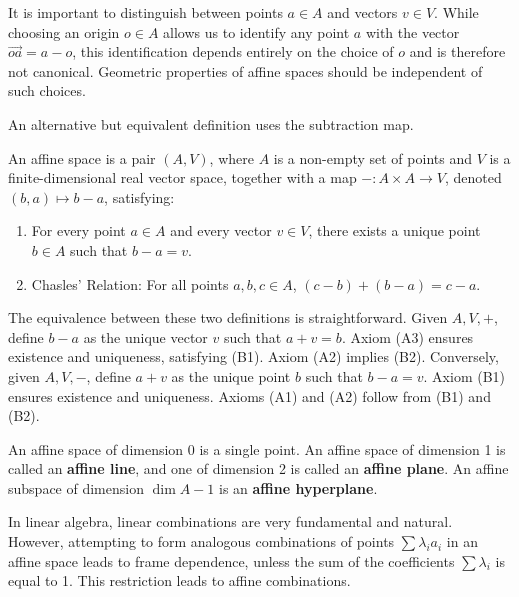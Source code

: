 It is important to distinguish between points $a \in A$ and vectors $v \in V$. While choosing an origin $o \in A$ allows us to identify any point $a$ with the vector $\vec{oa} = a - o$, this identification depends entirely on the choice of $o$ and is therefore not canonical. Geometric properties of affine spaces should be independent of such choices.

An alternative but equivalent definition uses the subtraction map.

\begin{definition}
An affine space is a pair $(A, V)$, where $A$ is a non-empty set of points and $V$ is a finite-dimensional real vector space, together with a map $- : A \times A \to V$, denoted $(b, a) \mapsto b - a$, satisfying:
\begin{enumerate}
    \item[(B1)] For every point $a \in A$ and every vector $v \in V$, there exists a unique point $b \in A$ such that $b - a = v$.
    \item[(B2)] Chasles' Relation: For all points $a, b, c \in A$, $(c - b) + (b - a) = c - a$.
\end{enumerate}
\end{definition}

The equivalence between these two definitions is straightforward. Given $A, V, +$, define $b - a$ as the unique vector $v$ such that $a + v = b$. Axiom (A3) ensures existence and uniqueness, satisfying (B1). Axiom (A2) implies (B2). Conversely, given $A, V, -$, define $a + v$ as the unique point $b$ such that $b - a = v$. Axiom (B1) ensures existence and uniqueness. Axioms (A1) and (A2) follow from (B1) and (B2).

An affine space of dimension 0 is a single point. An affine space of dimension 1 is called an \textbf{affine line}, and one of dimension 2 is called an \textbf{affine plane}. An affine subspace of dimension $\dim A - 1$ is an \textbf{affine hyperplane}.

In linear algebra, linear combinations are very fundamental and natural. However, attempting to form analogous combinations of points $\sum \lambda_i a_i$ in an affine space leads to frame dependence, unless the sum of the coefficients $\sum \lambda_i$ is equal to 1. This restriction leads to affine combinations.

